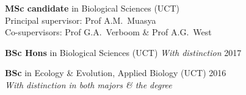 \begin{hangparas}{2em}{1}

\textbf{MSc candidate} in Biological Sciences
  {\small (UCT)                                                               \\
  \hspace{2em} Principal supervisor: Prof A.M.~Muasya                         \\
  \hspace{2em} Co-supervisors: Prof G.A.~Verboom \& Prof A.G.~West}

\textbf{BSc Hons} in Biological Sciences {\small (UCT) \textit{With distinction} \hfill 2017}

\textbf{BSc} in Ecology \& Evolution, Applied Biology {\small (UCT) \hfill 2016 \\
  \hspace{2em} \textit{With distinction in both majors \& the degree}}

\end{hangparas}
